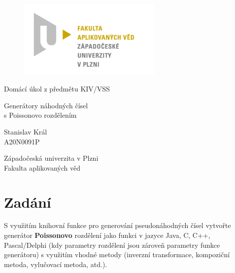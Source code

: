 \documentclass[12pt, a4paper]{article}
\let\oldsection\section
\renewcommand\section{\clearpage\oldsection}
\begin{document}
	\renewcommand{\lstlistingname}{Ukázka kódu}
	\renewcommand{\lstlistlistingname}{Seznam ukázek kódu}
    \begin{titlepage}

        \centering

        \vspace*{\baselineskip}
        \begin{figure}[H]
        \centering
        \includegraphics[width=7cm]{img/fav-logo.jpg}
        \end{figure}

        \vspace*{1\baselineskip}

        \vspace{0.75\baselineskip}

        \vspace{0.5\baselineskip}
        {Domácí úkol z předmětu KIV/VSS}

        {\LARGE\sc Generátory náhodných čísel\\}
        {\sc s Poissonovo rozdělením\\}

        \vspace{4\baselineskip}

        \vspace{0.5\baselineskip}

        {\sc\Large Stanislav Král \\}
        \vspace{0.5\baselineskip}
        {A20N0091P}

        \vfill

        {\sc Západočeská univerzita v Plzni\\
        Fakulta aplikovaných věd}

    \end{titlepage}

    \tableofcontents
    \pagebreak

\section{Zadání}
S využitím knihovní funkce pro generování pseudonáhodných čísel vytvořte generátor \textbf{Poissonovo} rozdělení jako funkci v jazyce Java, C, C++, Pascal/Delphi (kdy parametry rozdělení jsou zároveň parametry funkce generátoru) s využitím vhodné metody (inverzní transformace, kompoziční metoda, vylučovací metoda, atd.).
\end{document}
